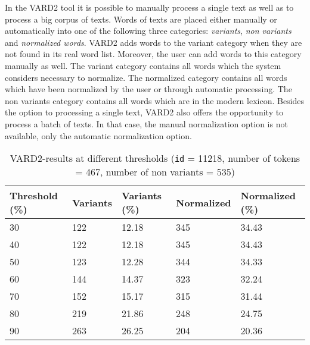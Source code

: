 In the VARD2 tool it is possible to manually process a single text as well as to process a big corpus of texts. Words of texts are placed either manually or automatically into one of the following three categories: \textit{variants}, \textit{non variants} and \textit{normalized words}. VARD2 adds words to the variant category when they are not found in its real word list. Moreover, the user can add words to this category manually as well. The variant category contains all words which the system considers necessary to normalize. The normalized category contains all words which have been normalized by the user or through automatic processing. The non variants category contains all words which are in the modern lexicon. Besides the option to processing a single text, VARD2 also offers the opportunity to process a batch of texts. In that case, the manual normalization option is not available, only the automatic normalization option.

\begin{table}[]
	\centering
	\begin{tabular}{lllll}
		\toprule
		Threshold (\%) & Variants & Variants (\%) & Normalized & Normalized (\%) \\ \midrule
		30             & 122      & 12.18         & 345        & 34.43           \\
		40             & 122      & 12.18         & 345        & 34.43           \\
		50             & 123      & 12.28         & 344        & 34.33           \\
		60             & 144      & 14.37         & 323        & 32.24           \\
		70             & 152      & 15.17         & 315        & 31.44           \\
		80             & 219      & 21.86         & 248        & 24.75           \\
		90             & 263      & 26.25         & 204        & 20.36   \\  
		\bottomrule     
	\end{tabular}
	\caption{VARD2-results at different thresholds (\texttt{id} = 11218, number of tokens = 467, number of non variants = 535)}
	\label{table:VardTresholds}
\end{table}

